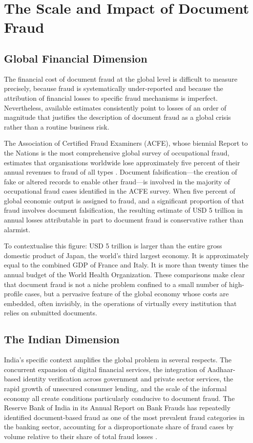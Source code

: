\documentclass[12pt,a4paper,oneside]{report}
\begin{document}
\section{The Scale and Impact of Document Fraud}

\subsection{Global Financial Dimension}

The financial cost of document fraud at the global level is difficult to
measure precisely, because fraud is systematically under-reported and because
the attribution of financial losses to specific fraud mechanisms is imperfect.
Nevertheless, available estimates consistently point to losses of an order
of magnitude that justifies the description of document fraud as a global
crisis rather than a routine business risk.

The Association of Certified Fraud Examiners (ACFE), whose biennial Report
to the Nations is the most comprehensive global survey of occupational fraud,
estimates that organisations worldwide lose approximately five percent of
their annual revenues to fraud of all types \cite{acfe2022}. Document
falsification---the creation of fake or altered records to enable other
fraud---is involved in the majority of occupational fraud cases identified
in the ACFE survey. When five percent of global economic output is
assigned to fraud, and a significant proportion of that fraud involves
document falsification, the resulting estimate of USD 5 trillion in annual
losses attributable in part to document fraud is conservative rather than
alarmist.

To contextualise this figure: USD 5 trillion is larger than the entire
gross domestic product of Japan, the world's third largest economy.
It is approximately equal to the combined GDP of France and Italy.
It is more than twenty times the annual budget of the World Health
Organization. These comparisons make clear that document fraud is not a
niche problem confined to a small number of high-profile cases, but a
pervasive feature of the global economy whose costs are embedded, often
invisibly, in the operations of virtually every institution that relies
on submitted documents.

\subsection{The Indian Dimension}

India's specific context amplifies the global problem in several respects.
The concurrent expansion of digital financial services, the integration of
Aadhaar-based identity verification across government and private sector
services, the rapid growth of unsecured consumer lending, and the scale
of the informal economy all create conditions particularly conducive to
document fraud. The Reserve Bank of India in its Annual Report on Bank Frauds
has repeatedly identified document-based fraud as one of the most prevalent
fraud categories in the banking sector, accounting for a disproportionate
share of fraud cases by volume relative to their share of total fraud losses
\cite{rbi2023}.
\end{document}
